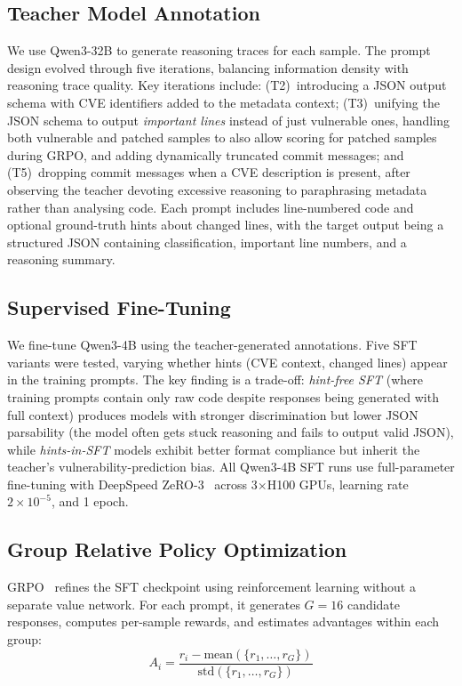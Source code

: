 \documentclass{article}
\begin{document}
\subsection{Teacher Model Annotation}

We use Qwen3-32B to generate reasoning traces for each sample. The prompt design evolved through five iterations, balancing information density with reasoning trace quality. Key iterations include: (T2)~introducing a JSON output schema with CVE identifiers added to the metadata context; (T3)~unifying the JSON schema to output \textit{important lines} instead of just vulnerable ones, handling both vulnerable and patched samples to also allow scoring for patched samples during GRPO, and adding dynamically truncated commit messages; and (T5)~dropping commit messages when a CVE description is present, after observing the teacher devoting excessive reasoning to paraphrasing metadata rather than analysing code. Each prompt includes line-numbered code and optional ground-truth hints about changed lines, with the target output being a structured JSON containing classification, important line numbers, and a reasoning summary.

\subsection{Supervised Fine-Tuning}

We fine-tune Qwen3-4B using the teacher-generated annotations. Five SFT variants were tested, varying whether hints (CVE context, changed lines) appear in the training prompts. The key finding is a trade-off: \textit{hint-free SFT} (where training prompts contain only raw code despite responses being generated with full context) produces models with stronger discrimination but lower JSON parsability (the model often gets stuck reasoning and fails to output valid JSON), while \textit{hints-in-SFT} models exhibit better format compliance but inherit the teacher's vulnerability-prediction bias. All Qwen3-4B SFT runs use full-parameter fine-tuning with DeepSpeed ZeRO-3~\cite{deepspeed} across 3$\times$H100 GPUs, learning rate $2\times10^{-5}$, and 1 epoch.

\subsection{Group Relative Policy Optimization}

GRPO~\cite{deepseekmath} refines the SFT checkpoint using reinforcement learning without a separate value network. For each prompt, it generates $G{=}16$ candidate responses, computes per-sample rewards, and estimates advantages within each group:
\begin{equation}
A_i = \frac{r_i - \text{mean}(\{r_1, \ldots, r_G\})}{\text{std}(\{r_1, \ldots, r_G\})}
\end{equation}
\end{document}
